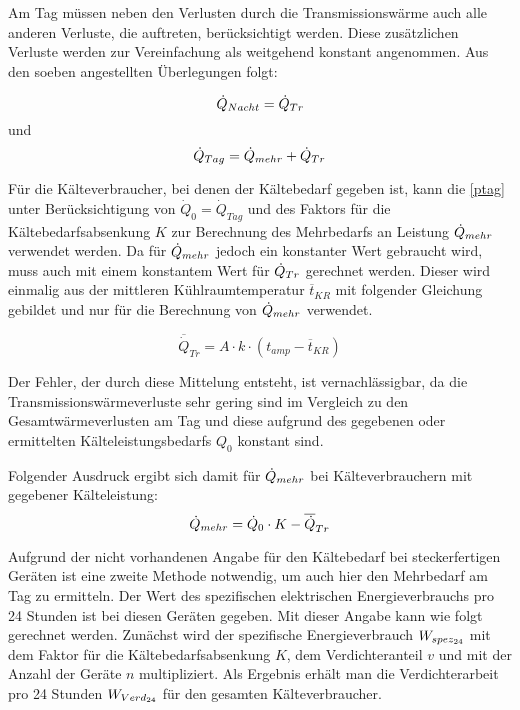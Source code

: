 Am Tag müssen neben den Verlusten durch die Transmissionswärme auch alle anderen Verluste, die auftreten, berücksichtigt
werden. Diese zusätzlichen Verluste werden zur Vereinfachung als weitgehend konstant angenommen.
Aus den soeben angestellten Überlegungen folgt:

\begin{equation}
	\dot{Q}_{Nacht}=\ptrans
\label{pnacht}
\end{equation}
und
\begin{equation}
	\dot{Q}_{Tag} = \pmehr + \ptrans
\label{ptag}
\end{equation}

Für die Kälteverbraucher, bei denen der Kältebedarf gegeben ist, kann die \cref{ptag} unter Berücksichtigung von
$\dot{Q}_0 = \dot{Q}_{Tag}$  und des Faktors für die Kältebedarfsabsenkung $K$ zur Berechnung des Mehrbedarfs an Leistung
$\dot{Q}_{mehr}$ verwendet werden. Da für $\dot{Q}_{mehr}$ jedoch ein konstanter Wert gebraucht wird, muss auch mit einem konstantem Wert für
$\dot{Q}_{Tr}$ gerechnet werden. Dieser wird einmalig aus der mittleren Kühlraumtemperatur $\overline{t}_{KR}$ mit folgender Gleichung
gebildet und nur für die Berechnung von $\dot{Q}_{mehr}$ verwendet.

\begin{equation}
	\overline{\dot{Q}}_{Tr} = A \cdot k \cdot \left( t_{amp} - \overline{t}_{KR} \right)
\label{ptrans}
\end{equation}

Der Fehler, der durch diese Mittelung entsteht, ist vernachlässigbar, da die Transmissionswärmeverluste sehr gering sind im
Vergleich zu den Gesamtwärmeverlusten am Tag und diese aufgrund des gegebenen oder ermittelten Kälteleistungsbedarfs $Q_0$
konstant sind.

Folgender Ausdruck ergibt sich damit für $\dot{Q}_{mehr}$ bei Kälteverbrauchern mit gegebener Kälteleistung:
\begin{equation}
	\pmehr = \pkalt \cdot K - \overline{\dot{Q}}_{Tr}%
\label{pmehr}
\end{equation}

Aufgrund der nicht vorhandenen Angabe für den Kältebedarf bei steckerfertigen Geräten ist eine zweite Methode notwendig, um
auch hier den Mehrbedarf am Tag zu ermitteln. Der Wert des spezifischen elektrischen Energieverbrauchs pro 24 Stunden ist bei
diesen Geräten gegeben. Mit dieser Angabe kann wie folgt gerechnet werden. Zunächst wird der spezifische Energieverbrauch
${W}_{spez_{24}}$ mit dem Faktor für die Kältebedarfsabsenkung $K$, dem Verdichteranteil $v$ und mit der Anzahl der Geräte $n$
multipliziert.  Als Ergebnis erhält man die Verdichterarbeit pro 24 Stunden ${W}_{Verd_{24}}$ für den gesamten Kälteverbraucher.

